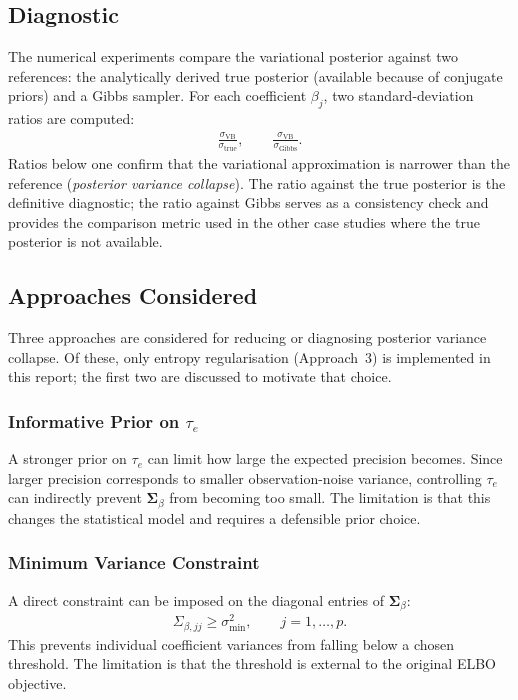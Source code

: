 \documentclass[11pt,a4paper]{article}
\begin{document}
\subsection{Diagnostic}

The numerical experiments compare the variational posterior against two references: the analytically derived true posterior (available because of conjugate priors) and a Gibbs sampler. For each coefficient $\beta_j$, two standard-deviation ratios are computed:
\begin{align}
\frac{\sigma_{\mathrm{VB}}}{\sigma_{\mathrm{true}}}, \qquad \frac{\sigma_{\mathrm{VB}}}{\sigma_{\mathrm{Gibbs}}}.
\end{align}
Ratios below one confirm that the variational approximation is narrower than the reference (\emph{posterior variance collapse}). The ratio against the true posterior is the definitive diagnostic; the ratio against Gibbs serves as a consistency check and provides the comparison metric used in the other case studies where the true posterior is not available.

\subsection{Approaches Considered}

Three approaches are considered for reducing or diagnosing posterior variance collapse. Of these, only entropy regularisation (Approach~3) is implemented in this report; the first two are discussed to motivate that choice.

\subsubsection{Informative Prior on $\tau_e$}

A stronger prior on $\tau_e$ can limit how large the expected precision becomes. Since larger precision corresponds to smaller observation-noise variance, controlling $\tau_e$ can indirectly prevent $\bm{\Sigma}_\beta$ from becoming too small. The limitation is that this changes the statistical model and requires a defensible prior choice.

\subsubsection{Minimum Variance Constraint}

A direct constraint can be imposed on the diagonal entries of $\bm{\Sigma}_\beta$:
\begin{align}
\Sigma_{\beta,jj} \geq \sigma^2_{\min}, \qquad j=1,\ldots,p.
\end{align}
This prevents individual coefficient variances from falling below a chosen threshold. The limitation is that the threshold is external to the original ELBO objective.
\end{document}
